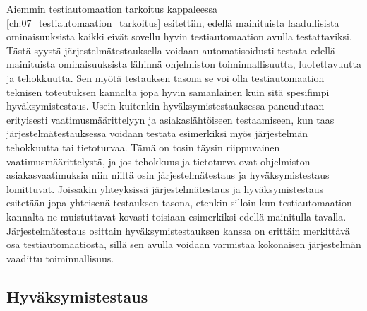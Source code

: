 

    Aiemmin testiautomaation tarkoitus kappaleessa \ref{ch:07_testiautomaation_tarkoitus} esitettiin, edellä mainituista laadullisista ominaisuuksista kaikki eivät sovellu hyvin testiautomaation avulla testattaviksi.
    Tästä syystä järjestelmätestauksella voidaan automatisoidusti testata edellä mainituista ominaisuuksista lähinnä ohjelmiston toiminnallisuutta, luotettavuutta ja tehokkuutta.
    Sen myötä testauksen tasona se voi olla testiautomaation teknisen toteutuksen kannalta jopa hyvin samanlainen kuin sitä spesifimpi hyväksymistestaus.
    Usein kuitenkin hyväksymistestauksessa paneudutaan erityisesti vaatimusmäärittelyyn ja asiakaslähtöiseen testaamiseen, kun taas järjestelmätestauksessa voidaan testata esimerkiksi myös järjestelmän tehokkuutta tai tietoturvaa.
    Tämä on tosin täysin riippuvainen vaatimusmäärittelystä, ja jos tehokkuus ja tietoturva ovat ohjelmiston asiakasvaatimuksia niin niiltä osin järjestelmätestaus ja hyväksymistestaus lomittuvat.
    Joissakin yhteyksissä järjestelmätestaus ja hyväksymistestaus esitetään jopa yhteisenä testauksen tasona, etenkin silloin kun testiautomaation kannalta ne muistuttavat kovasti toisiaan esimerkiksi edellä mainitulla tavalla.
    Järjestelmätestaus osittain hyväksymistestauksen kanssa on erittäin merkittävä osa testiautomaatiosta, sillä sen avulla voidaan varmistaa kokonaisen järjestelmän vaadittu toiminnallisuus.

  \subsection{Hyväksymistestaus} \label{ch:07_hyvaksymistestaus}


